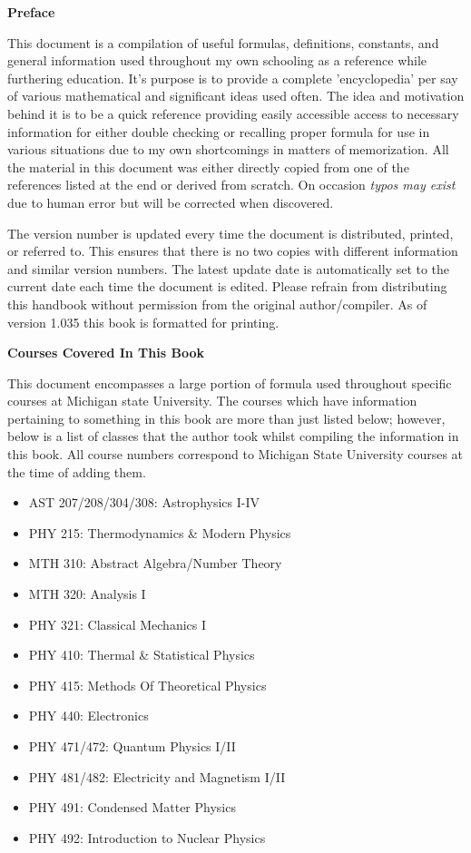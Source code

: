 \begin{center}
	\textbf{Preface}
\end{center}

This document is a compilation of useful formulas, definitions, constants, and general information used throughout my own schooling as a reference while furthering education. It's purpose is to provide a complete 'encyclopedia' per say of various mathematical and significant ideas used often. The idea and motivation behind it is to be a quick reference providing easily accessible access to necessary information for either double checking or recalling proper formula for use in various situations due to my own shortcomings in matters of memorization. All the material in this document was either directly copied from one of the references listed at the end or derived from scratch. On occasion \textit{typos may exist} due to human error but will be corrected when discovered.
	
The version number is updated every time the document is distributed, printed, or referred to. This ensures that there is no two copies with different information and similar version numbers. The latest update date is automatically set to the current date each time the document is edited. Please refrain from distributing this handbook without permission from the original author/compiler. As of version 1.035 this book is formatted for printing.

\begin{center}
	\textbf{Courses Covered In This Book}
\end{center}

This document encompasses a large portion of formula used throughout specific courses at Michigan state University. The courses which have information pertaining to something in this book are more than just listed below; however, below is a list of classes that the author took whilst compiling the information in this book. All course numbers correspond to Michigan State University courses at the time of adding them. 

\begin{multicols}{2}
\begin{itemize}
	\item AST 207/208/304/308: Astrophysics I-IV
	\item PHY 215: Thermodynamics \& Modern Physics
	\item MTH 310: Abstract Algebra/Number Theory
	\item MTH 320: Analysis I
	\item PHY 321: Classical Mechanics I
	\item PHY 410: Thermal \& Statistical Physics
	\item PHY 415: Methods Of Theoretical Physics
	\item PHY 440: Electronics
	\item PHY 471/472: Quantum Physics I/II
	\item PHY 481/482: Electricity and Magnetism I/II
	\item PHY 491: Condensed Matter Physics
	\item PHY 492: Introduction to Nuclear Physics
\end{itemize} 
\end{multicols}

